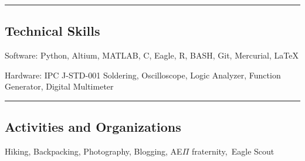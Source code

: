 \documentclass[10pt,letterpaper]{article}
\newenvironment{indentsection}[1]%
{\begin{list}{}%
	{\setlength{\leftmargin}{#1}}%
	\item[]%
}
{\end{list}}
\begin{document}
\hrule
\vspace{-0.4em}
\subsection*{Technical Skills}

\begin{description*}
	\item[Software:]
	 Python, Altium, MATLAB, C, Eagle, R, BASH, Git, Mercurial, \LaTeX
	\item[Hardware:]
	IPC J-STD-001 Soldering, Oscilloscope, Logic Analyzer, Function Generator, Digital Multimeter
\end{description*}

\hrule
\vspace{-0.4em}
\subsection*{Activities and Organizations}
\indent Hiking, Backpacking, Photography, Blogging, AE$\Pi$ fraternity,\, Eagle Scout
\end{document}
